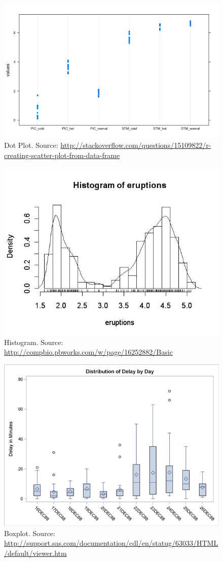 \documentclass[12pt,a4paper]{report}
\begin{document}
 
\begin{figure}
\centering
\includegraphics[width=0.7\linewidth]{art/lmCm0}
\caption[Dot Plot]{Dot Plot. Source: \url{http://stackoverflow.com/questions/15109822/r-creating-scatter-plot-from-data-frame}}
\label{fig:dot_plot}
\end{figure}



\begin{figure}
\centering
\includegraphics[width=0.7\linewidth]{art/histogram_eruptions}
\caption[Histogram]{Histogram. Source: \url{http://compbio.pbworks.com/w/page/16252882/Basic}}
\label{fig:histogram_eruptions}
\end{figure}

\begin{figure}
\centering
\includegraphics[width=0.7\linewidth]{art/ex6aout}
\caption[BoxPlot]{Boxplot. Source: \url{http://support.sas.com/documentation/cdl/en/statug/63033/HTML/default/viewer.htm}}
\label{fig:boxplot}
\end{figure}
\end{document}
